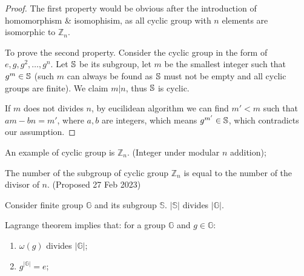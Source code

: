 \documentclass[../note.tex]{subfiles}
\begin{document}
\begin{proof}
	The first property would be obvious after the introduction of homomorphism \& isomophisim, as all cyclic group with $n$ elements are isomorphic to $\mathbb{Z}_n$.
	
	To prove the second property. Consider the cyclic group in the form of $e, g, g^2, \dots, g^n$. Let $\mathbb{S}$ be its subgroup, let $m$ be the smallest integer such that $g^m \in \mathbb{S}$ (such $m$ can always be found as $\mathbb{S}$ must not be empty and all cyclic groups are finite). We claim $m|n$, thus $\mathbb{S}$ is cyclic.

	If $m$ does not divides $n$, by eucilidean algorithm we can find $m'<m$ such that $am-bn=m'$, where $a,b$ are integers, which means $g^{m'}\in \mathbb{S}$, which contradicts our assumption.
\end{proof}

\begin{example}
An example of cyclic group is $\mathbb{Z}_n$. (Integer under modular $n$ addition);
\end{example}

\begin{proposition}
	The number of the subgroup of cyclic group $\mathbb{Z}_n$ is equal to the number of the divisor of $n$. (Proposed 27 Feb 2023)
\end{proposition}

\begin{definition}

\end{definition}

\begin{theorem}
Consider finite group $\mathbb{G}$ and its subgroup $\mathbb{S}$. $|\mathbb{S}|$ divides $|\mathbb{G}|.$	
\end{theorem}

\begin{proposition}
Lagrange theorem implies that:
for a group $\mathbb{G}$ and $g \in \mathbb{G}$:

\begin{enumerate}
	\item $\omega (g)$ divides $|\mathbb{G}|$; 
	\item $g^{|\mathbb{G}|}=e$;
\end{enumerate}
\end{proposition}
\end{document}
